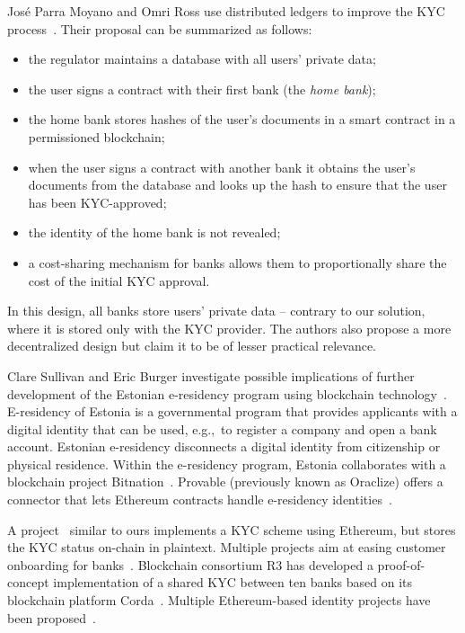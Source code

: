 Jos{\'{e}} Parra Moyano and Omri Ross use distributed ledgers to improve the KYC process~\cite{Moyano2017}.
Their proposal can be summarized as follows:
\begin{itemize}
	\item the regulator maintains a database with all users' private data;
	\item the user signs a contract with their first bank (the \textit{home bank});
	\item the home bank stores hashes of the user's documents in a smart contract in a permissioned blockchain;
	\item when the user signs a contract with another bank it obtains the user's documents from the database and looks up the hash to ensure that the user has been KYC-approved;
	\item the identity of the home bank is not revealed;
	\item a cost-sharing mechanism for banks allows them to proportionally share the cost of the initial KYC approval.
\end{itemize}
In this design, all banks store users' private data -- contrary to our solution, where it is stored only with the KYC provider.
The authors also propose a more decentralized design but claim it to be of lesser practical relevance.

Clare Sullivan and Eric Burger investigate possible implications of further development of the Estonian e-residency program using blockchain technology~\cite{Sullivan2017}.
E-residency of Estonia is a governmental program that provides applicants with a digital identity that can be used, e.g.,~to register a company and open a bank account.
Estonian e-residency disconnects a digital identity from citizenship or physical residence.
Within the e-residency program, Estonia collaborates with a blockchain project Bitnation~\cite{Bitnation15, Estonia15}.
Provable (previously known as Oraclize) offers a connector that lets Ethereum contracts handle e-residency identities~\cite{Provable}.

A project~\cite{Ohtamaa2016} similar to ours implements a KYC scheme using Ethereum, but stores the KYC status on-chain in plaintext.
Multiple projects aim at easing customer onboarding for banks~\cite{CambridgeBlockchain, KycChain, SnapSwap, Tradle}.
Blockchain consortium R3 has developed a proof-of-concept implementation of a shared KYC between ten banks based on its blockchain platform Corda~\cite{Allison2016}.
Multiple Ethereum-based identity projects have been proposed~\cite{Mesropyan2017, Sovrin, Uport}.


